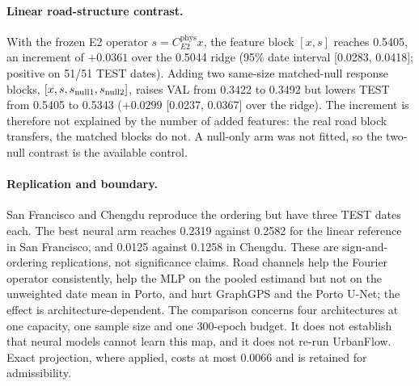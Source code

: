 \paragraph{Linear road-structure contrast.} With the frozen E2 operator $s=C_{E2}^{\mathrm{phys}}x$, the feature block $[x,s]$ reaches 0.5405, an increment of $+0.0361$ over the 0.5044 ridge (95\% date interval [0.0283, 0.0418]; positive on 51/51 TEST dates). Adding two same-size matched-null response blocks, $[x,s,s_{\rm null1},s_{\rm null2}]$, raises VAL from 0.3422 to 0.3492 but lowers TEST from 0.5405 to 0.5343 ($+0.0299$ [0.0237, 0.0367] over the ridge). The increment is therefore not explained by the number of added features: the real road block transfers, the matched blocks do not. A null-only arm was not fitted, so the two-null contrast is the available control.

\paragraph{Replication and boundary.} San Francisco and Chengdu reproduce the ordering but have three TEST dates each. The best neural arm reaches 0.2319 against 0.2582 for the linear reference in San Francisco, and 0.0125 against 0.1258 in Chengdu. These are sign-and-ordering replications, not significance claims. Road channels help the Fourier operator consistently, help the MLP on the pooled estimand but not on the unweighted date mean in Porto, and hurt GraphGPS and the Porto U-Net; the effect is architecture-dependent. The comparison concerns four architectures at one capacity, one sample size and one 300-epoch budget. It does not establish that neural models cannot learn this map, and it does not re-run UrbanFlow. Exact projection, where applied, costs at most 0.0066 and is retained for admissibility.
